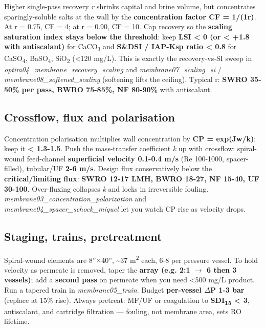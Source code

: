 \documentclass[11pt,a4paper]{article}
\begin{document}
Higher single-pass recovery \emph{r} shrinks capital and brine volume,
but concentrates sparingly-soluble salts at the wall by the
\textbf{concentration factor CF = 1/(1\textminus{}r)}. At r = 0.75, CF = 4; at r =
0.90, CF = 10. Cap recovery so the \textbf{scaling saturation index
stays below the threshold}: keep \textbf{LSI \textless{} 0 (or
\textless{} +1.8 with antiscalant)} for CaCO\textsubscript{3} and \textbf{S\&DSI /
IAP-Ksp ratio \textless{} 0.8} for CaSO\textsubscript{4}, BaSO\textsubscript{4}, SiO\textsubscript{2} (\textless120
mg/L). This is exactly the recovery-vs-SI sweep in
\emph{optim04\_membrane\_recovery\_scaling} and
\emph{membrane07\_scaling\_si} / \emph{membrane08\_softened\_scaling}
(softening lifts the ceiling). Typical r: \textbf{SWRO 35-50\% per pass,
BWRO 75-85\%, NF 80-90\%} with antiscalant.

\hypertarget{crossflow-flux-and-polarisation}{%
\subsection{Crossflow, flux and
polarisation}\label{crossflow-flux-and-polarisation}}

Concentration polarisation multiplies wall concentration by \textbf{CP =
exp(Jw/k)}; keep it \textbf{\textless{} 1.3-1.5}. Push the mass-transfer
coefficient \emph{k} up with crossflow: spiral-wound feed-channel
\textbf{superficial velocity 0.1-0.4 m/s} (Re 100-1000, spacer-filled),
tubular/UF \textbf{2-6 m/s}. Design flux conservatively below the
\textbf{critical/limiting flux}: \textbf{SWRO 12-17 LMH, BWRO 18-27, NF
15-40, UF 30-100}. Over-fluxing collapses \emph{k} and locks in
irreversible fouling. \emph{membrane03\_concentration\_polarization} and
\emph{membrane04\_spacer\_schock\_miquel} let you watch CP rise as
velocity drops.

\hypertarget{staging-trains-pretreatment}{%
\subsection{Staging, trains,
pretreatment}\label{staging-trains-pretreatment}}

Spiral-wound elements are 8''\(\times\)40'', \textasciitilde37 m\textsuperscript{2} each, 6-8 per
pressure vessel. To hold velocity as permeate is removed, taper the
\textbf{array (e.g. 2:1 \(\rightarrow\) 6 then 3 vessels)}; add a \textbf{second pass}
on permeate when you need \textless500 mg/L product. Run a tapered train
in \emph{membrane05\_train}. Budget \textbf{per-vessel \(\Delta\)P 1-3 bar}
(replace at 15\% rise). Always pretreat: MF/UF or coagulation to
\textbf{SDI\textsubscript{1}\textsubscript{5} \textless{} 3}, antiscalant, and cartridge filtration ---
fouling, not membrane area, sets RO lifetime.
\end{document}
